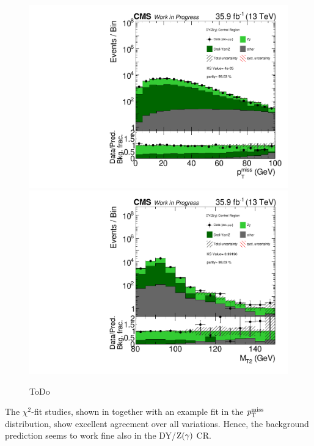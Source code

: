 \begin{figure}[tbp]
 \centering
 \includegraphics[width=\pairwidth]{figures/plots_CR_dy/CRDY_LL_nom_met_log}
 \includegraphics[width=\pairwidth]{figures/plots_CR_dy/CRDY_LL_nom_mt2_log}
 \caption{ToDo}
 \label{fig:CRDY}
\end{figure}
The $\chi^2$-fit studies, shown in  together with an example fit in the $p_{\mathrm{T}}^\text{miss}$ distribution, show excellent agreement over all variations. Hence, the background prediction seems to work fine also in the DY/$\mathrm{Z}(\gamma)$ CR.

